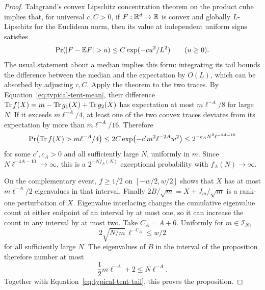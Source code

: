 \begin{proof}
Talagrand's convex Lipschitz concentration theorem on the product
cube~\cite[Theorem~3]{Talagrand} implies that, for universal \(c,C>0\),
if \(F:\mathbb R^d\to\mathbb R\) is convex and globally \(L\)-Lipschitz for the
Euclidean norm, then its value at independent uniform signs satisfies
\[
 \Pr(|F-\E F|>u)\le C\exp(-cu^2/L^2)\qquad(u\ge0).
\]
The usual statement about a median implies this form: integrating
its tail bounds the difference between the median and the expectation
by \(O(L)\), which can be absorbed by adjusting \(c,C\).
Apply the theorem to the two traces. By
Equation~\eqref{eq:typical-tent-mean}, their difference
\(\operatorname{Tr} f(X)=m-\operatorname{Tr} g_1(X)+\operatorname{Tr} g_2(X)\) has expectation at most
\(m\ell^{-A}/8\) for large \(N\). If it exceeds
\(m\ell^{-A}/4\), at least one of the two convex traces deviates
from its expectation by more than \(m\ell^{-A}/16\). Therefore
\begin{equation}\label{eq:typical-tent-tail}
 \Pr\bigl(\operatorname{Tr} f(X)>m\ell^{-A}/4\bigr)
 \le 2C\exp\bigl(-c' m^2\ell^{-2A}w^2\bigr)
 \le 2^{-c_A N^2\ell^{-4A-10}}
\end{equation}
for some \(c',c_A>0\) and all sufficiently large \(N\), uniformly
in \(m\). Since \(N\ell^{-4A-10}\to\infty\), this is a
\(2^{-Nf_A(N)}\) exceptional probability with \(f_A(N)\to\infty\).

On the complementary event, \(f\ge1/2\) on \([-w/2,w/2]\) shows
that \(X\) has at most \(m\ell^{-A}/2\) eigenvalues in that
interval. Finally \(2B/\sqrt m=X+J_m/\sqrt m\) is a rank-one
perturbation of \(X\). Eigenvalue interlacing changes the cumulative
eigenvalue count at either endpoint of an interval by at most one,
so it can increase the count in any interval by at most two. Take
\(C_A=A+6\). Uniformly for \(m\in\mathcal I_N\),
\[
 2\sqrt{N/m}\,\ell^{-C_A}\le w/2
\]
for all sufficiently large \(N\). The eigenvalues of \(B\) in the
interval of the proposition therefore number at most
\[
 \frac12m\ell^{-A}+2\le N\ell^{-A}.
\]
Together with Equation~\eqref{eq:typical-tent-tail}, this proves the
proposition.
\end{proof}
